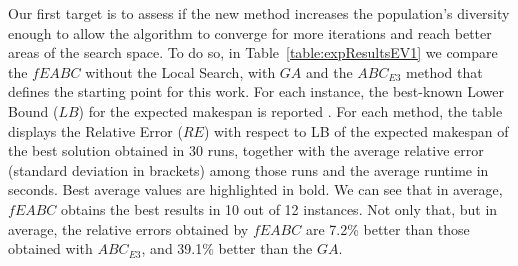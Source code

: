 \documentclass[sn-mathphys]{sn-jnl}%
\theoremstyle{thmstyleone}%
\theoremstyle{thmstyletwo}%
\theoremstyle{thmstylethree}%
\begin{document}
Our first target is to assess if the new method increases the population's diversity enough to allow the algorithm to converge for more iterations and reach better areas of the search space. To do so, in Table~\ref{table:expResultsEV1} we compare the $fEABC$ without the Local Search, with $GA$ and the $ABC_{E3}$ method that defines the starting point for this work. For each instance, the best-known Lower Bound ($LB$) for the expected makespan is reported \cite{Diaz2022}. For each method, the table displays the Relative Error ($RE$) with respect to LB of the expected makespan of the best solution obtained in 30 runs, together with the average relative error (standard deviation in brackets) among those runs and the average runtime in seconds. Best average values are highlighted in bold. We can see that in average, $fEABC$ obtains the best results in 10 out of 12 instances. Not only that, but in average, the relative errors obtained by $fEABC$ are 7.2\% better than those obtained with $ABC_{E3}$, and 39.1\% better than the $GA$.
\end{document}
